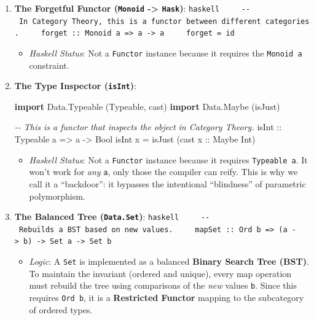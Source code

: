 \documentclass[
]{article}
\newenvironment{Shaded}{}{}
\newcommand{\CommentTok}[1]{\textcolor[rgb]{0.38,0.63,0.69}{\textit{#1}}}
\newcommand{\DataTypeTok}[1]{\textcolor[rgb]{0.56,0.13,0.00}{#1}}
\newcommand{\KeywordTok}[1]{\textcolor[rgb]{0.00,0.44,0.13}{\textbf{#1}}}
\newcommand{\NormalTok}[1]{#1}
\newcommand{\OtherTok}[1]{\textcolor[rgb]{0.00,0.44,0.13}{#1}}
\providecommand{\tightlist}{%
  \setlength{\itemsep}{0pt}\setlength{\parskip}{0pt}}
\begin{document}
\begin{enumerate}
\def\labelenumi{\arabic{enumi}.}
\item
  \textbf{The Forgetful Functor (\texttt{Monoid} -\textgreater{}
  \texttt{Hask})}:
  \texttt{haskell\ \ \ \ \ -\/-\ In\ Category\ Theory,\ this\ is\ a\ functor\ between\ different\ categories.\ \ \ \ \ forget\ ::\ Monoid\ a\ =\textgreater{}\ a\ -\textgreater{}\ a\ \ \ \ \ forget\ =\ id}

  \begin{itemize}
  \tightlist
  \item
    \emph{Haskell Status}: Not a \texttt{Functor} instance because it
    requires the \texttt{Monoid\ a} constraint.
  \end{itemize}
\item
  \textbf{The Type Inspector (\texttt{isInt})}:

\begin{Shaded}
\begin{Highlighting}[]
\KeywordTok{import} \DataTypeTok{Data.Typeable}\NormalTok{ (}\DataTypeTok{Typeable}\NormalTok{, cast)}
\KeywordTok{import} \DataTypeTok{Data.Maybe}\NormalTok{ (isJust)}

\CommentTok{{-}{-} This is a functor that inspects the object in Category Theory.}
\OtherTok{isInt ::} \DataTypeTok{Typeable}\NormalTok{ a }\OtherTok{=\textgreater{}}\NormalTok{ a }\OtherTok{{-}\textgreater{}} \DataTypeTok{Bool}
\NormalTok{isInt x }\OtherTok{=}\NormalTok{ isJust (cast}\OtherTok{ x ::} \DataTypeTok{Maybe} \DataTypeTok{Int}\NormalTok{)}
\end{Highlighting}
\end{Shaded}

  \begin{itemize}
  \tightlist
  \item
    \emph{Haskell Status}: Not a \texttt{Functor} instance because it
    requires \texttt{Typeable\ a}. It won't work for \emph{any}
    \texttt{a}, only those the compiler can reify. This is why we call
    it a ``backdoor'': it bypasses the intentional ``blindness'' of
    parametric polymorphism.
  \end{itemize}
\item
  \textbf{The Balanced Tree (\texttt{Data.Set})}:
  \texttt{haskell\ \ \ \ \ -\/-\ Rebuilds\ a\ BST\ based\ on\ new\ values.\ \ \ \ \ mapSet\ ::\ Ord\ b\ =\textgreater{}\ (a\ -\textgreater{}\ b)\ -\textgreater{}\ Set\ a\ -\textgreater{}\ Set\ b}

  \begin{itemize}
  \tightlist
  \item
    \emph{Logic}: A \texttt{Set} is implemented as a balanced
    \textbf{Binary Search Tree (BST)}. To maintain the invariant
    (ordered and unique), every map operation must rebuild the tree
    using comparisons of the \emph{new} values \texttt{b}. Since this
    requires \texttt{Ord\ b}, it is a \textbf{Restricted Functor}
    mapping to the subcategory of ordered types.
  \end{itemize}
\end{enumerate}
\end{document}
